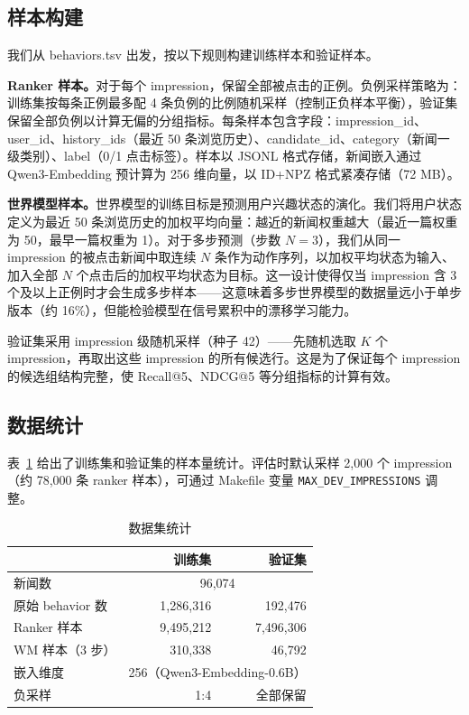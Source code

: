 \documentclass[twocolumn,10pt,a4paper]{ctexart}
\begin{document}
\subsection{样本构建}

我们从 behaviors.tsv 出发，按以下规则构建训练样本和验证样本。

\textbf{Ranker 样本。}对于每个 impression，保留全部被点击的正例。负例采样策略为：训练集按每条正例最多配 4 条负例的比例随机采样（控制正负样本平衡），验证集保留全部负例以计算无偏的分组指标。每条样本包含字段：impression\_id、user\_id、history\_ids（最近 50 条浏览历史）、candidate\_id、category（新闻一级类别）、label（0/1 点击标签）。样本以 JSONL 格式存储，新闻嵌入通过 Qwen3-Embedding 预计算为 256 维向量，以 ID+NPZ 格式紧凑存储（72 MB）。

\textbf{世界模型样本。}世界模型的训练目标是预测用户兴趣状态的演化。我们将用户状态定义为最近 50 条浏览历史的加权平均向量：越近的新闻权重越大（最近一篇权重为 50，最早一篇权重为 1）。对于多步预测（步数 $N=3$），我们从同一 impression 的被点击新闻中取连续 $N$ 条作为动作序列，以加权平均状态为输入、加入全部 $N$ 个点击后的加权平均状态为目标。这一设计使得仅当 impression 含 3 个及以上正例时才会生成多步样本——这意味着多步世界模型的数据量远小于单步版本（约 16\%），但能检验模型在信号累积中的漂移学习能力。

验证集采用 impression 级随机采样（种子 42）——先随机选取 $K$ 个 impression，再取出这些 impression 的所有候选行。这是为了保证每个 impression 的候选组结构完整，使 Recall@5、NDCG@5 等分组指标的计算有效。

\subsection{数据统计}

表~\ref{tab:data} 给出了训练集和验证集的样本量统计。评估时默认采样 2,000 个 impression（约 78,000 条 ranker 样本），可通过 Makefile 变量 \texttt{MAX\_DEV\_IMPRESSIONS} 调整。

\begin{table}[H]
\centering
\caption{数据集统计}
\label{tab:data}
\small
\begin{tabular}{@{}lrr@{}}
\toprule
& 训练集 & 验证集 \\
\midrule
新闻数 & \multicolumn{2}{c}{96,074} \\
原始 behavior 数 & 1,286,316 & 192,476 \\
Ranker 样本 & 9,495,212 & 7,496,306 \\
WM 样本（3 步） & 310,338 & 46,792 \\
嵌入维度 & \multicolumn{2}{c}{256（Qwen3-Embedding-0.6B）} \\
负采样 & 1:4 & 全部保留 \\
\bottomrule
\end{tabular}
\end{table}
\end{document}
